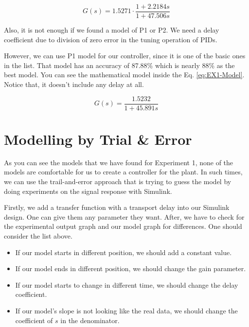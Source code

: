 \documentclass[11pt,a4paper,twocolumn]{article}
\begin{document}
\begin{equation}
    G(s) = 1.5271 \cdot \frac{1 + 2.2184s}{1 + 47.506s}
    \label{eq:EX1-BestModel}
\end{equation}

Also, it is not enough if we found a model of P1 or P2. We need a delay coefficient due to division of zero error in the tuning operation of PIDs.

However, we can use P1 model for our controller, since it is one of the basic ones in the list. That model has an accuracy of 87.88\% which is nearly 88\% as the best model. You can see the mathematical model inside the Eq. \eqref{eq:EX1-Model}. Notice that, it doesn't include any delay at all.

\begin{equation}
    G(s) = \frac{1.5232}{1 + 45.891s}
    \label{eq:EX1-Model}
\end{equation}


\section{Modelling by Trial \& Error}
\label{sec:modeltrialerror}
As you can see the models that we have found for Experiment 1, none of the models are comfortable for us to create a controller for the plant. In such times, we can use the trail-and-error approach that is trying to guess the model by doing experiments on the signal response with Simulink.

Firstly, we add a transfer function with a transport delay into our Simulink design. One can give them any parameter they want. After, we have to check for the experimental output graph and our model graph for differences. One should consider the list above.

\begin{itemize}
    \item If our model starts in different position, we should add a constant value.
    \item If our model ends in different position, we should change the gain parameter.
    \item If our model starts to change in different time, we should change the delay coefficient.
    \item If our model's slope is not looking like the real data, we should change the coefficient of $s$ in the denominator.
\end{itemize}
\end{document}
